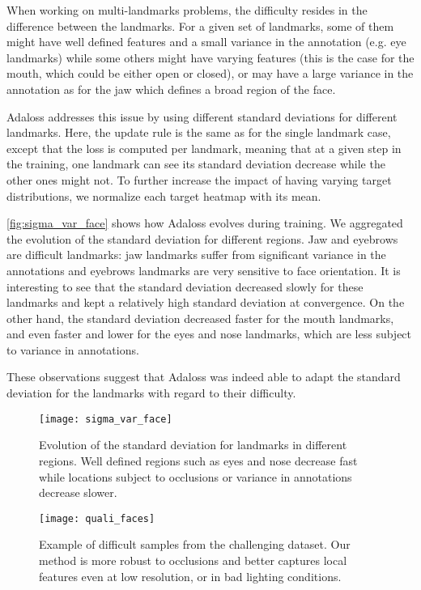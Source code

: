 \documentclass[10pt,twocolumn,letterpaper]{article}
\begin{document}
When working on multi-landmarks problems, the difficulty resides
in the difference between the landmarks. For a given set of
landmarks, some of them might have well defined features and a small
variance in the annotation (e.g. eye landmarks) while some
others might have varying features (this is the case for the mouth,
which could be either open or closed), or may have a large variance in
the annotation as for the jaw which defines a broad region of the face.




Adaloss addresses this issue by using different standard deviations
for different landmarks. Here, the update rule is the same as for the
single landmark case, except that the loss is computed per landmark,
meaning that at a given step in the training, one landmark can see its
standard deviation decrease while the other ones might not. To further
increase the impact of having varying target distributions, we normalize
each target heatmap with its mean.

\autoref{fig:sigma_var_face} shows how Adaloss evolves during
training. We aggregated the evolution of the standard deviation for
different regions. Jaw and eyebrows are difficult landmarks: jaw
landmarks suffer from significant variance in the annotations and
eyebrows landmarks are very sensitive to face orientation. It is
interesting to see that the standard deviation decreased slowly for
these landmarks and kept a relatively high standard deviation at
convergence. On the other hand, the standard deviation decreased faster
for the mouth landmarks, and even faster and lower for the eyes and
nose landmarks, which are less subject to variance in annotations.

These observations suggest that Adaloss was indeed able
to adapt the standard deviation for the landmarks with regard to their
difficulty.

\begin{figure}[h]
  \centering
  \texttt{[image: sigma\_var\_face]}
  \caption{Evolution of the standard deviation for landmarks in
    different regions. Well defined regions such as eyes and nose
    decrease fast while locations subject to occlusions or variance
    in annotations decrease slower.}
  \label{fig:sigma_var_face}
\end{figure}

\begin{figure*}[t]
  \begin{center}
    \centering
	\texttt{[image: quali\_faces]}
	\caption{Example of difficult samples from the challenging
          dataset. Our method is more robust to occlusions and better
          captures local features even at low resolution, or in bad
          lighting conditions.}
	\label{fig:quali_face}
  \end{center}
\end{figure*}
\end{document}
